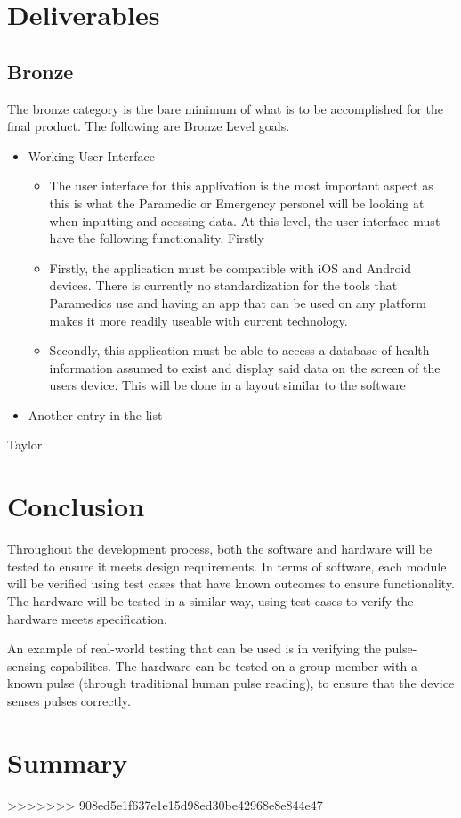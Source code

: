\documentclass{article}
\begin{document}
\fi

\section{Deliverables}
\subsection{Bronze}
The bronze category is the bare minimum of what is to be accomplished for the final product. The following are Bronze Level goals.
\begin{itemize}
  \item Working User Interface
	\begin{itemize}
	\item The user interface for this applivation is the most important aspect as this is what the Paramedic or Emergency personel will be looking at when inputting and acessing data. At this level, the user interface must have the following functionality. Firstly
	\item Firstly, the application must be compatible with iOS and Android devices. There is currently no standardization for the tools that Paramedics use and having an app that can be used on any platform makes it more readily useable with current technology.
	\item Secondly, this application must be able to access a database of health information assumed to exist and display said data on the screen of the users device. This will be done in a layout similar to the software
	\end{itemize}
  \item Another entry in the list
\end{itemize}
Taylor

\section{Conclusion}

Throughout the development process, both the software and hardware will be tested to ensure it meets design requirements. In terms of software, each module will be verified using test cases that have known outcomes to ensure functionality. The hardware will be tested in a similar way, using test cases to verify the hardware meets specification.

An example of real-world testing that can be used is in verifying the pulse-sensing capabilites. The hardware can be tested on a group member with a known pulse (through traditional human pulse reading), to ensure that the device senses pulses correctly.

\section{Summary}


>>>>>>> 908ed5e1f637e1e15d98ed30be42968e8e844e47






\end{document}
